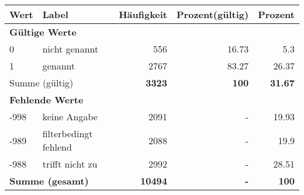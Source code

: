      \begin{longtable}{lXrrr}
     \toprule
     \textbf{Wert} & \textbf{Label} & \textbf{Häufigkeit} & \textbf{Prozent(gültig)} & \textbf{Prozent} \\
     \endhead
     \midrule
     \multicolumn{5}{l}{\textbf{Gültige Werte}}\\

     0 &
     \multicolumn{1}{X}{ nicht genannt   } &


       \num{556} &
       \num[round-mode=places,round-precision=2]{16,73} &
         \num[round-mode=places,round-precision=2]{5,3} \\

     1 &
     \multicolumn{1}{X}{ genannt   } &


       \num{2767} &
       \num[round-mode=places,round-precision=2]{83,27} &
         \num[round-mode=places,round-precision=2]{26,37} \\
     \midrule
     \multicolumn{2}{l}{Summe (gültig)} &
       \textbf{\num{3323}} &
     \textbf{100} &
       \textbf{\num[round-mode=places,round-precision=2]{31,67}} \\
     \multicolumn{5}{l}{\textbf{Fehlende Werte}}\\
       -998 &
       keine Angabe &
         \num{2091} &
        - &
         \num[round-mode=places,round-precision=2]{19,93} \\
       -989 &
       filterbedingt fehlend &
         \num{2088} &
        - &
         \num[round-mode=places,round-precision=2]{19,9} \\
       -988 &
       trifft nicht zu &
         \num{2992} &
        - &
         \num[round-mode=places,round-precision=2]{28,51} \\
     \midrule
     \multicolumn{2}{l}{\textbf{Summe (gesamt)}} &
          \textbf{\num{10494}} &
        \textbf{-} &
        \textbf{100} \\
     \bottomrule
     \end{longtable}
     
